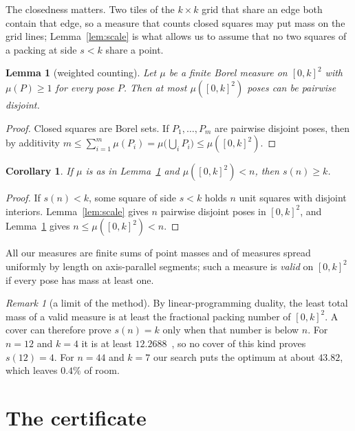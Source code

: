 \documentclass[11pt]{amsart}
\newtheorem{lemma}[theorem]{Lemma}
\newtheorem{corollary}[theorem]{Corollary}
\theoremstyle{remark}
\newtheorem{remark}[theorem]{Remark}
\begin{document}
The closedness matters. Two tiles of the $k\times k$ grid that share an edge both contain that edge, so a measure
that counts closed squares may put mass on the grid lines; Lemma~\ref{lem:scale} is what allows us to assume that
no two squares of a packing at side $s<k$ share a point.

\begin{lemma}[weighted counting]\label{lem:count}
Let $\mu$ be a finite Borel measure on $[0,k]^2$ with $\mu(P)\ge1$ for every pose $P$. Then at most
$\mu([0,k]^2)$ poses can be pairwise disjoint.
\end{lemma}

\begin{proof}
Closed squares are Borel sets. If $P_1,\dots,P_m$ are pairwise disjoint poses, then by additivity
$m\le\sum_{i=1}^m\mu(P_i)=\mu\bigl(\bigcup_i P_i\bigr)\le\mu([0,k]^2)$.
\end{proof}

\begin{corollary}\label{cor:lower}
If $\mu$ is as in Lemma~\ref{lem:count} and $\mu([0,k]^2)<n$, then $s(n)\ge k$.
\end{corollary}

\begin{proof}
If $s(n)<k$, some square of side $s<k$ holds $n$ unit squares with disjoint interiors. Lemma~\ref{lem:scale} gives
$n$ pairwise disjoint poses in $[0,k]^2$, and Lemma~\ref{lem:count} gives $n\le\mu([0,k]^2)<n$.
\end{proof}

All our measures are finite sums of point masses and of measures spread uniformly by length on axis-parallel
segments; such a measure is \emph{valid} on $[0,k]^2$ if every pose has mass at least one.

\begin{remark}[a limit of the method]
By linear-programming duality, the least total mass of a valid measure is at least the fractional packing number
of $[0,k]^2$. A cover can therefore prove $s(n)=k$ only when that number is below $n$. For $n=12$ and $k=4$ it is at
least $12.2688$~\cite{daniel}, so no cover of this kind proves $s(12)=4$. For $n=44$ and $k=7$ our search puts the
optimum at about $43.82$, which leaves $0.4\%$ of room.
\end{remark}

\section{The certificate}
\end{document}
